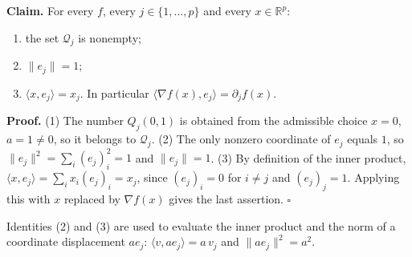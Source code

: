 \documentclass[11pt,a4paper]{report}
\begin{document}
\textbf{Claim.} For every \(f\), every \(j\in\{1,\dots,p\}\) and every \(x\in\mathbb R^p\):



\begin{enumerate}


\item the set \(\mathcal Q_j\) is nonempty;

\item \(\|e_j\|=1\);

\item \(\langle x,e_j\rangle=x_j\). In particular \(\langle\nabla f(x),e_j\rangle=\partial_jf(x)\).

\end{enumerate}



\textbf{Proof.} (1) The number \(Q_j(0,1)\) is obtained from the admissible choice \(x=0\), \(a=1\ne0\), so it belongs to \(\mathcal Q_j\). (2) The only nonzero coordinate of \(e_j\) equals \(1\), so \(\|e_j\|^2=\sum_i(e_j)_i^2=1\) and \(\|e_j\|=1\). (3) By definition of the inner product, \(\langle x,e_j\rangle=\sum_ix_i(e_j)_i=x_j\), since \((e_j)_i=0\) for \(i\ne j\) and \((e_j)_j=1\). Applying this with \(x\) replaced by \(\nabla f(x)\) gives the last assertion. \(\square\)




Identities (2) and (3) are used to evaluate the inner product and the norm of a coordinate displacement \(ae_j\): \(\langle v,ae_j\rangle=a\,v_j\) and \(\|ae_j\|^2=a^2\).
\end{document}
